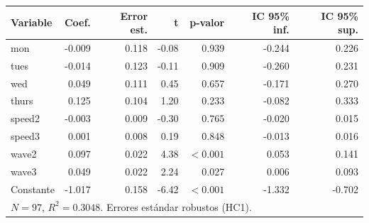 
\begin{tabular}{lrrrrrr}
\toprule
Variable & Coef. & Error est. & t & p-valor & IC 95\% inf. & IC 95\% sup.\\
\midrule
mon & -0.009 & 0.118 & -0.08 & 0.939 & -0.244 & 0.226\\
tues & -0.014 & 0.123 & -0.11 & 0.909 & -0.260 & 0.231\\
wed & 0.049 & 0.111 & 0.45 & 0.657 & -0.171 & 0.270\\
thurs & 0.125 & 0.104 & 1.20 & 0.233 & -0.082 & 0.333\\
speed2 & -0.003 & 0.009 & -0.30 & 0.765 & -0.020 & 0.015\\
speed3 & 0.001 & 0.008 & 0.19 & 0.848 & -0.013 & 0.016\\
wave2 & 0.097 & 0.022 & 4.38 & $<0.001$ & 0.053 & 0.141\\
wave3 & 0.049 & 0.022 & 2.24 & 0.027 & 0.006 & 0.093\\
Constante & -1.017 & 0.158 & -6.42 & $<0.001$ & -1.332 & -0.702\\
\midrule
\multicolumn{7}{l}{$N=97$, $R^2=0.3048$. Errores estándar robustos (HC1).}\\
\bottomrule
\end{tabular}
